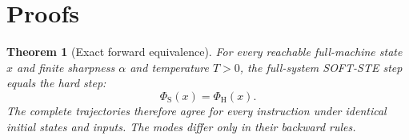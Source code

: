 \documentclass[letterpaper]{article} %
\newtheorem{theorem}{Theorem}
\begin{document}
\section{Proofs}

\begin{theorem}[Exact forward equivalence]
\label{thm:s-exact}
For every reachable full-machine state $x$ and finite
sharpness $\alpha$ and temperature $T>0$, the full-system
SOFT-STE step equals the hard step:
\begin{equation}
\Phi_{\mathrm{S}}(x)=\Phi_{\mathrm{H}}(x).
\label{eq:s-onestep}
\end{equation}
The complete trajectories therefore agree for every
instruction under identical initial states and inputs.
The modes differ only in their backward rules.
\end{theorem}
\end{document}
